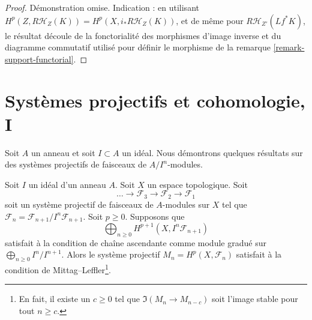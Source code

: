 \begin{proof}
Démonstration omise. Indication : en utilisant $H^p(Z, R\mathcal{H}_Z(K)) = H^p(X, i_*R\mathcal{H}_Z(K))$, et de même pour $R\mathcal{H}_{Z'}(Lf^*K)$, le résultat découle de la fonctorialité des morphismes d'image inverse et du diagramme commutatif utilisé pour définir le morphisme de la remarque \ref{remark-support-functorial}.
\end{proof}





\section{Systèmes projectifs et cohomologie, I}

\label{section-inverse-systems}

\noindent
Soit $A$ un anneau et soit $I \subset A$ un idéal. Nous démontrons quelques résultats sur des systèmes projectifs de faisceaux de $A/I^n$-modules.

\begin{lemma}

\label{lemma-ML-general}

Soit $I$ un idéal d'un anneau $A$. Soit $X$ un espace topologique. Soit
$$
\ldots \to \mathcal{F}_3 \to \mathcal{F}_2 \to \mathcal{F}_1
$$
soit un système projectif de faisceaux de $A$-modules sur $X$
tel que $\mathcal{F}_n = \mathcal{F}_{n + 1}/I^n\mathcal{F}_{n + 1}$. Soit $p \geq 0$. Supposons que
$$
\bigoplus\nolimits_{n \geq 0} H^{p + 1}(X, I^n\mathcal{F}_{n + 1})
$$
satisfait à la condition de chaîne ascendante comme module gradué sur
$\bigoplus_{n \geq 0} I^n/I^{n + 1}$. Alors le système projectif $M_n = H^p(X, \mathcal{F}_n)$ satisfait à la condition de Mittag--Leffler\footnote{En fait, il existe un $c \geq 0$ tel que $\Im(M_n \to M_{n - c})$ soit l'image stable pour tout $n \geq c$.}.

\end{lemma}

